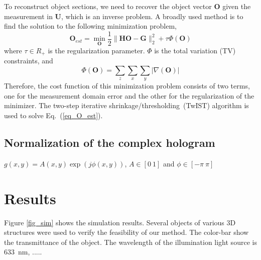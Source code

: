 \documentclass[9pt,twocolumn,twoside]{osajnl}
\begin{document}
To reconstruct object sections, we need to recover the object vector $\mathbf{O}$ given the measurement in $\mathbf{U}$, which is
an inverse problem. A broadly used method is to find the solution to the following minimization problem,
\begin{equation}
\mathbf{O}_{est} = \min_\mathbf{O} \frac{1}{2} \lVert \mathbf{H}\mathbf{O} - \mathbf{G} \rVert _2^2  + \tau \Phi(\mathbf{O})
\label{eq_O_est}
\end{equation}
where $\tau \in R_+$ is the regularization parameter. $\Phi$ is the total variation (TV) constraints, and
\begin{equation}
\Phi(\mathbf{O})=\sum_z\sum_x\sum_y\lvert \nabla (\mathbf{O})\rvert
\label{eq_TV}
\end{equation}
Therefore, the cost function of this minimization problem consists of two terms, one for the measurement domain error and the other for the regularization of the minimizer. 
The two-step iterative shrinkage/thresholding~(TwIST) algorithm is used to solve Eq.~(\ref{eq_O_est}).
%
%

\subsection{Normalization of the complex hologram}
$g(x,y)=A(x,y)\exp(j\phi(x,y))$, $A \in [0 ~ 1]$ and $\phi \in [-\pi ~ \pi]$ 
\section{Results}\label{sec_results}

Figure \ref{fig_sim} shows the simulation results. 
Several objects of various 3D structures were used to verify the feasibility of our method. The color-bar show the transmittance of the object. 
The wavelength of the illumination light source is \SI{633}{\nano\meter}, ..... 
\end{document}
